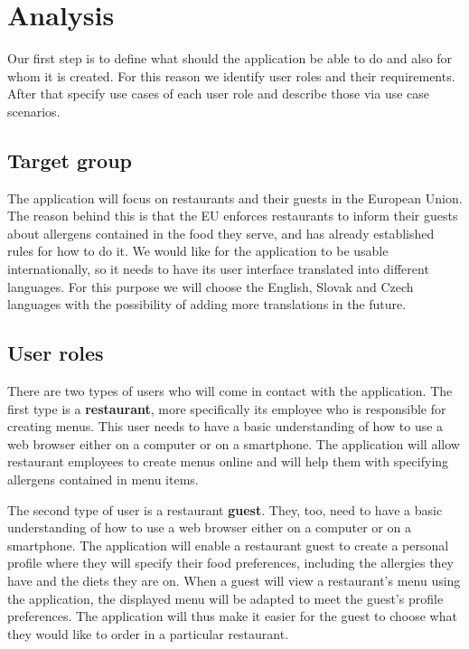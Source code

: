 \chapter{Analysis}
Our first step is to define what should the application be able to do and also for whom it is created.
For this reason we identify user roles and their requirements. 
After that specify use cases of each user role and describe those via use case scenarios.

\section{Target group}
The application will focus on restaurants and their guests in the European Union.
The reason behind this is that the EU enforces restaurants to inform their guests about allergens contained in the food they serve, and has already established rules for how to do it.
We would like for the application to be usable internationally, so it needs to have its user interface translated into different languages.
For this purpose we will choose the English, Slovak and Czech languages with the possibility of adding more translations in the future.

\section{User roles}
There are two types of users who will come in contact with the application.
The first type is a \textbf{restaurant}, more specifically its employee who is responsible for creating menus.
This user needs to have a basic understanding of how to use a web browser either on a computer or on a smartphone.
The application will allow restaurant employees to create menus online and will help them with specifying allergens contained in menu items.

The second type of user is a restaurant \textbf{guest}.
They, too, need to have a basic understanding of how to use a web browser either on a computer or on a smartphone.
The application will enable a restaurant guest to create a personal profile where they will specify their food preferences, including the allergies they have and the diets they are on.
When a guest will view a restaurant's menu using the application, the displayed menu will be adapted to meet the guest's profile preferences.
The application will thus make it easier for the guest to choose what they would like to order in a particular restaurant.

\newpage

